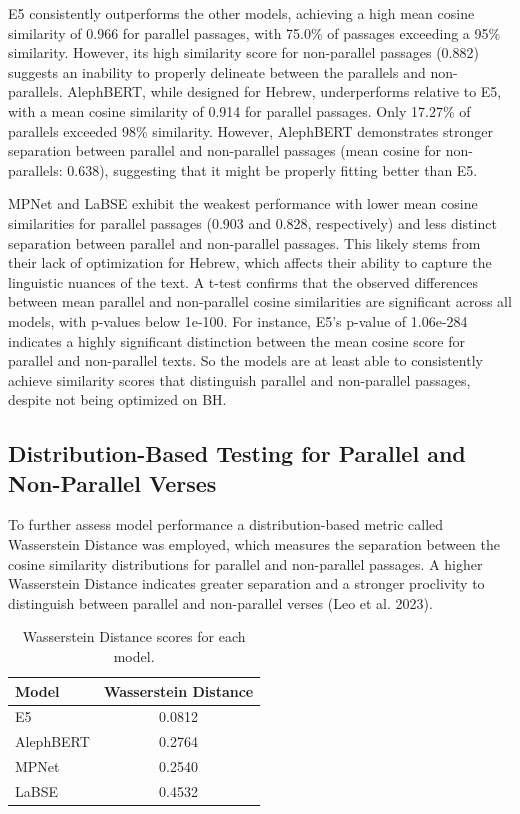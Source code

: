 \documentclass[12pt]{article}
\begin{document}
E5 consistently outperforms the other models, achieving a high mean cosine similarity of 0.966 for parallel passages, with 75.0\% of passages exceeding a 95\% similarity. However, its high similarity score for non-parallel passages (0.882) suggests an inability to properly delineate between the parallels and non-parallels. AlephBERT, while designed for Hebrew, underperforms relative to E5, with a mean cosine similarity of 0.914 for parallel passages. Only 17.27\% of parallels exceeded 98\% similarity. However, AlephBERT demonstrates stronger separation between parallel and non-parallel passages (mean cosine for non-parallels: 0.638), suggesting that it might be properly fitting better than E5.

MPNet and LaBSE exhibit the weakest performance with lower mean cosine similarities for parallel passages (0.903 and 0.828, respectively) and less distinct separation between parallel and non-parallel passages. This likely stems from their lack of optimization for Hebrew, which affects their ability to capture the linguistic nuances of the text.
A t-test confirms that the observed differences between mean parallel and non-parallel cosine similarities are significant across all models, with p-values below 1e-100. For instance, E5’s p-value of 1.06e-284 indicates a highly significant distinction between the mean cosine score for parallel and non-parallel texts. So the models are at least able to consistently achieve similarity scores that distinguish parallel and non-parallel passages, despite not being optimized on BH.

\subsection{Distribution-Based Testing for Parallel and Non-Parallel Verses}
To further assess model performance a distribution-based metric called Wasserstein Distance was employed, which measures the separation between the cosine similarity distributions for parallel and non-parallel passages. A higher Wasserstein Distance indicates greater separation and a stronger proclivity to distinguish between parallel and non-parallel verses (Leo et al. 2023). 
\begin{table}[htbp]
\centering
\label{tab:wasserstein}
\begin{tabular}{@{}lc@{}}
\toprule
\textbf{Model} & \textbf{Wasserstein Distance} \\ 
\midrule
E5         & 0.0812 \\
AlephBERT  & 0.2764 \\
MPNet      & 0.2540 \\
LaBSE      & 0.4532 \\
\bottomrule
\end{tabular}
\caption{Wasserstein Distance scores for each model.}
\end{table}
\end{document}
